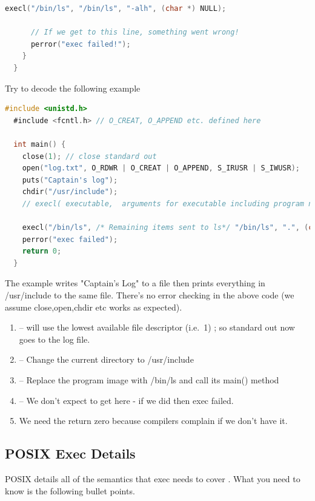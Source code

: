 \begin{itemize}
\begin{itemize}
\begin{lstlisting}[language=C]
      execl("/bin/ls", "/bin/ls", "-alh", (char *) NULL);

      // If we get to this line, something went wrong!
      perror("exec failed!");
    }
  }
\end{lstlisting}

Try to decode the following example

\begin{lstlisting}[language=C]
  #include <unistd.h>
  #include <fcntl.h> // O_CREAT, O_APPEND etc. defined here

  int main() {
    close(1); // close standard out
    open("log.txt", O_RDWR | O_CREAT | O_APPEND, S_IRUSR | S_IWUSR);
    puts("Captain's log");
    chdir("/usr/include");
    // execl( executable,  arguments for executable including program name and NULL at the end)

    execl("/bin/ls", /* Remaining items sent to ls*/ "/bin/ls", ".", (char *) NULL); // "ls ."
    perror("exec failed");
    return 0;
  }
\end{lstlisting}

The example writes "Captain's Log" to a file then prints everything in /usr/include to the same file.
There's no error checking in the above code (we assume close,open,chdir etc works as expected).

\begin{enumerate}
\item {} -- will use the lowest available file descriptor (i.e.~1) ; so standard out now goes to the log file.
\item {} -- Change the current directory to /usr/include
\item {} -- Replace the program image with /bin/ls and call its main() method
\item {} -- We don't expect to get here - if we did then exec failed.
\item We need the return zero because compilers complain if we don't have it.
\end{enumerate}

\subsection{POSIX Exec Details}

POSIX details all of the semantics that exec needs to cover \cite{exec_2018}.
What you need to know is the following bullet points.


\end{itemize}
\end{itemize}

